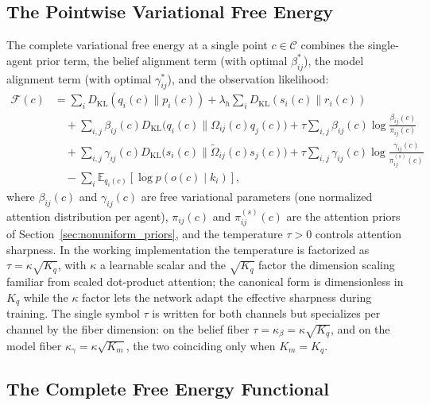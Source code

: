 \documentclass[11pt]{article}
\begin{document}
\subsection{The Pointwise Variational Free Energy}

The complete variational free energy at a single point $c \in \mathcal{C}$ combines the single-agent prior term, the belief alignment term (with optimal $\beta^*_{ij}$), the model alignment term (with optimal $\gamma^*_{ij}$), and the observation likelihood:
\begin{equation}
\begin{aligned}
\mathcal{F}(c) &= \sum_i D_{\mathrm{KL}}(q_i(c) \| p_i(c)) + \lambda_h \sum_i D_{\mathrm{KL}}(s_i(c) \| r_i(c)) \\
&\quad + \sum_{i,j} \beta_{ij}(c)  D_{\mathrm{KL}}\big(q_i(c) \big\| \Omega_{ij}(c)q_j(c)\big) + \tau \sum_{i,j} \beta_{ij}(c) \log\frac{\beta_{ij}(c)}{\pi_{ij}(c)} \\
&\quad + \sum_{i,j} \gamma_{ij}(c)  D_{\mathrm{KL}}\big(s_i(c) \big\| \tilde{\Omega}_{ij}(c)s_j(c)\big) + \tau \sum_{i,j} \gamma_{ij}(c) \log\frac{\gamma_{ij}(c)}{\pi^{(s)}_{ij}(c)} \\
&\quad - \sum_i \mathbb{E}_{q_i(c)}[\log p(o(c) \mid k_i)],
\end{aligned}
\label{eq:pointwise_free_energy}
\end{equation}
where $\beta_{ij}(c)$ and $\gamma_{ij}(c)$ are free variational parameters (one normalized attention distribution per agent), $\pi_{ij}(c)$ and $\pi^{(s)}_{ij}(c)$ are the attention priors of Section~\ref{sec:nonuniform_priors}, and the temperature $\tau > 0$ controls attention sharpness. In the working implementation the temperature is factorized as $\tau = \kappa\sqrt{K_q}$, with $\kappa$ a learnable scalar and the $\sqrt{K_q}$ factor the dimension scaling familiar from scaled dot-product attention; the canonical form is dimensionless in $K_q$ while the $\kappa$ factor lets the network adapt the effective sharpness during training. The single symbol $\tau$ is written for both channels but specializes per channel by the fiber dimension: on the belief fiber $\tau = \kappa_\beta = \kappa\sqrt{K_q}$, and on the model fiber $\kappa_\gamma = \kappa\sqrt{K_m}$, the two coinciding only when $K_m = K_q$.

\subsection{The Complete Free Energy Functional}
\label{sec:complete_free_energy}
\end{document}
